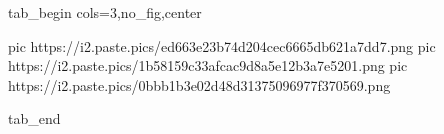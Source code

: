  
 
 
 
 


\ifcmt
  tab_begin cols=3,no_fig,center

     pic https://i2.paste.pics/ed663e23b74d204cec6665db621a7dd7.png
		 pic https://i2.paste.pics/1b58159c33afcac9d8a5e12b3a7e5201.png
		 pic https://i2.paste.pics/0bbb1b3e02d48d31375096977f370569.png

  tab_end
\fi
